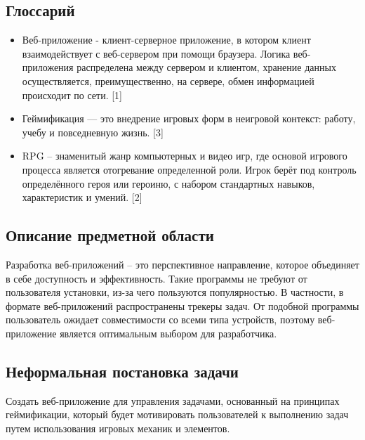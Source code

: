 \documentclass[../document.tex]{subfiles}
\begin{document}
\subsection{Глоссарий}
\begin{itemize}
    \item Веб-приложение - клиент-серверное приложение, в котором клиент взаимодействует с веб-сервером при помощи браузера. Логика веб-приложения распределена между сервером и клиентом, хранение данных осуществляется, преимущественно, на сервере, обмен информацией происходит по сети. [1]
    \item Геймификация — это внедрение игровых форм в неигровой контекст: работу, учебу и повседневную жизнь. [3]
    \item RPG – знаменитый жанр компьютерных и видео игр, где основой игрового процесса является отогревание определенной роли. Игрок берёт под контроль определённого героя или героиню, с набором стандартных навыков, характеристик и умений. [2]
\end{itemize}
\subsection{Описание предметной области}
\par Разработка веб-приложений – это перспективное направление, которое объединяет в себе доступность и эффективность. Такие программы не требуют от пользователя установки, из-за чего пользуются популярностью. В частности, в формате веб-приложений распространены трекеры задач. От подобной программы пользователь ожидает совместимости со всеми типа устройств, поэтому веб-приложение является оптимальным выбором для разработчика.
\subsection{Неформальная постановка задачи}
\par Создать веб-приложение для управления задачами, основанный на принципах геймификации, который будет мотивировать пользователей к выполнению задач путем использования игровых механик и элементов.
\pagebreak
\end{document}
